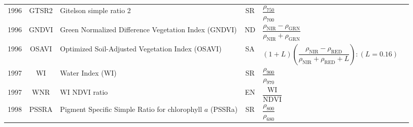 \documentclass[10pt]{article}
\begin{document}
\begin{ThreePartTable}
\begin{longtable}{c c m{2.3in} c M{2.8in} M{1.5in}}
  1996 & GTSR2   & Gitelson simple ratio 2                                                        & SR & $\dfrac{\rho_{750}}{\rho_{700}}$                                                                                                                                                                                                                                                        & \citet{Gitelson1996b,Gitelson1997,Lichtenthaler1996}\\
  1996 & GNDVI   & Green Normalized Difference Vegetation Index (GNDVI)                           & ND & $\dfrac{\rho_\text{NIR}-\rho_\text{GRN}}{\rho_\text{NIR}+\rho_\text{GRN}}$                                                                                                                                                                                                              & \citet{Gitelson1996a}                               \\
  1996 & OSAVI   & Optimized Soil-Adjusted Vegetation Index (OSAVI)                               & SA & $(1 + L)\left(\dfrac{\rho_\text{NIR}-\rho_\text{RED}}{\rho_\text{NIR}+\rho_\text{RED}+L}\right):(L=0.16)$                                                                                                                                                                               & \citet{Rondeaux1996}                                \\
  1997 & WI      & Water Index (WI)                                                               & SR & $\dfrac{\rho_{900}}{\rho_{970}}$                                                                                                                                                                                                                                                        & \citet{Penuelas1997}                                \\
  1997 & WNR     & WI NDVI ratio                                                                  & EN & $\dfrac{\text{WI}}{\text{NDVI}}$                                                                                                                                                                                                                                                        & \citet{Penuelas1997}                                \\
  1998 & PSSRA   & Pigment Specific Simple Ratio for chlorophyll $a$ (PSSRa)                      & SR & $\dfrac{\rho_{800}}{\rho_{680}}$                                                                                                                                                                                                                                                        & \citet{Blackburn1998a,Blackburn1998b}               \\

\end{longtable}
\end{ThreePartTable}
\end{document}
